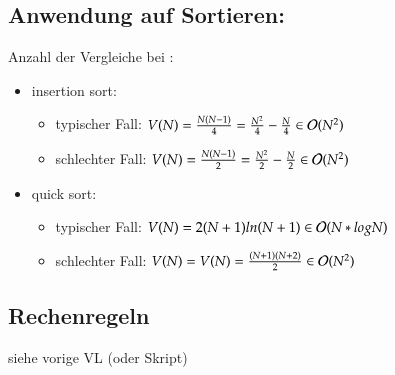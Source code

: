 \subsection*{Anwendung auf Sortieren:}
Anzahl der Vergleiche bei :
\begin{itemize}
    \item insertion sort:
    \begin{itemize}
        \item typischer Fall: $V(N)= \frac{N(N-1)}{4} = \frac{N^2}{4} - \frac{N}{4} \in \mathcal{O}{}(N^2)$ \\
        \item schlechter Fall: $V(N) = \frac{N(N-1)}{2} = \frac{N^2}{2} - \frac{N}{2} \in  \mathcal{O}{}(N^2) $\\
    \end{itemize}
    \item quick sort:
    \begin{itemize}
        \item typischer Fall: $V(N) = 2(N+1) ln(N+1) \in \mathcal{O}{}(N*log N)$
        \item schlechter Fall: $V(N) = V(N) = \frac{(N+1)(N+2)}{2} \in \mathcal{O}{}(N^2) $\\
    \end{itemize}
\end{itemize}

\subsection*{Rechenregeln}
siehe vorige VL (oder Skript)

